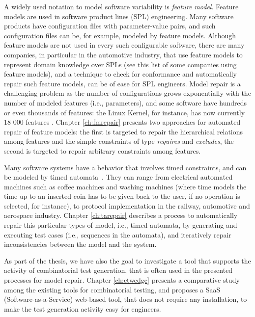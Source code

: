 A widely used notation to model software variability is \textit{feature model}. Feature models are used in software product lines (SPL) engineering. Many software products have configuration files with parameter-value pairs, and such configuration files can be, for example, modeled by feature models. Although feature models are not used in every such configurable software, there are many companies, in particular in the automotive industry, that use feature models to represent domain knowledge over SPLs (see this list \cite{deJong2001} of some companies using feature models), and a technique to check for conformance and automatically repair such feature models, can be of ease for SPL engineers. 
Model repair is a challenging problem as the number of configurations grows exponentially with the number of modeled features (i.e., parameters), and some software have hundreds or even thousands of features: the Linux Kernel, for instance, has now currently 18 000 features \cite{thum_towards_2019}.
Chapter \ref{ch:fmrepair} presents two approaches for automated repair of feature models: the first is targeted to repair the hierarchical relations among features and the simple constraints of type \textit{requires} and \textit{excludes}, the second is targeted to repair arbitrary constraints among features.

Many software systems have a behavior that involves timed constraints, and can be modeled by timed automata~\cite{ACEF09,AD94,AFKS12}. They can range from electrical automated machines such as coffee machines and washing machines (where time models the time up to an inserted coin has to be given back to the user, if no operation is selected, for instance), to protocol implementation in the railway, automotive and aerospace industry.
Chapter \ref{ch:tarepair} describes a process to automatically repair this particular types of model, i.e., timed automata, by generating and executing test cases (i.e., sequences in the automata), and iteratively repair inconsistencies between the model and the system.

As part of the thesis, we have also the goal to investigate a tool that supports the activity of combinatorial test generation, that is often used in the presented processes for model repair.
Chapter \ref{ch:ctwedge} presents a comparative study among the existing tools for combinatorial testing, and proposes a SaaS (Software-as-a-Service) web-based tool, that does not require any installation, to make the test generation activity easy for engineers.

